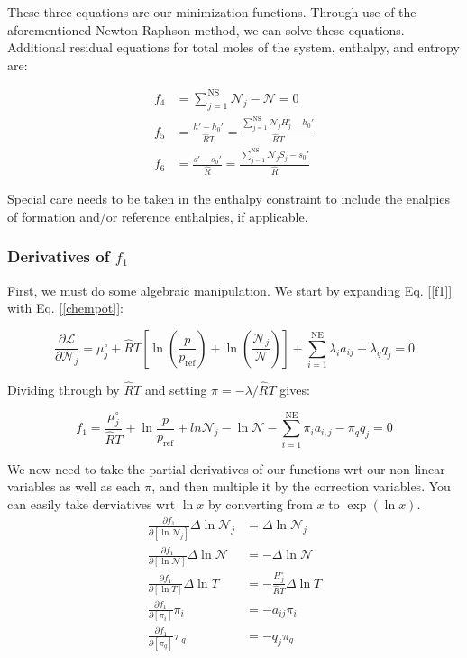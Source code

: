\documentclass[10pt]{article}
\begin{document}
\begin{flushleft}
These three equations are our minimization functions. Through use of the aforementioned Newton-Raphson method, we can solve these equations. Additional residual equations for total moles of the system, enthalpy, and entropy are:

\begin{align}
    f_4 &= \sum_{j=1}^\text{NS} \mathcal{N}_j - \mathcal{N} = 0
    \\ f_5 &= \frac{h' - h_0'}{\hat{R}T} = \frac{\sum_{j=1}^\text{NS} \mathcal{N}_j H_j^\circ - h_0'}{\hat{R}T}
    \\ f_6 &= \frac{s' - s_0'}{\hat{R}} = \frac{\sum_{j=1}^\text{NS} \mathcal{N}_j S_j - s_0'}{\hat{R}}
\end{align}

Special care needs to be taken in the enthalpy constraint to include the enalpies of formation and/or reference enthalpies, if applicable.

\subsubsection{Derivatives of $f_1$}

First, we must do some algebraic manipulation. We start by expanding Eq. [\ref{f1}] with Eq. [\ref{chempot}]:

\begin{equation}
    \frac{\partial \mathcal{L}}{\partial \mathcal{N}_j} = \mu_j^\circ + \hat{R}T \left[\ln\left(\frac{p}{p_\text{ref}}\right) + \ln \left( \frac{\mathcal{N}_j}{\mathcal{N}} \right) \right] + \sum_{i=1}^\text{NE}\lambda_i a_{ij} + \lambda_q q_j = 0
\end{equation}

Dividing through by $\hat{R}T$ and setting $\pi = -\lambda/\hat{R}T$ gives:

\begin{equation}
    f_1 = \frac{\mu_j^\circ}{\hat{R}T} + \ln{\frac{p}{p_\text{ref}}} + ln{\mathcal{N}_j} - \ln{\mathcal{N}} - \sum_{i=1}^\text{NE}\pi_ia_{i,j} - \pi_q q_j = 0
    \label{f11}
\end{equation}


We now need to take the partial derivatives of our functions wrt our non-linear variables as well as each $\pi$, and then multiple it by the correction variables. You can easily take derviatives wrt $\ln x$
by converting from $x$ to $\exp (\ln x)$.
\begin{align}
    \frac{\partial f_1}{\partial[\ln{\mathcal{N}_j}]} \Delta\ln{\mathcal{N}_j} &= \Delta\ln{\mathcal{N}_j}
    \\ \frac{\partial f_1}{\partial[\ln{\mathcal{N}}]} \Delta\ln{\mathcal{N}} &= -\Delta\ln{\mathcal{N}}
    \\ \frac{\partial f_1}{\partial [\ln T]} \Delta \ln T &= - \frac{H_j^\circ}{\hat{R}T} \Delta \ln T
    \\ \frac{\partial f_1}{\partial [\pi_i]} \pi_i &= -a_{ij} \pi_i
    \\ \frac{\partial f_1}{\partial [\pi_q]} \pi_q &= -q_j \pi_q
\end{align}


\end{flushleft}
\end{document}
